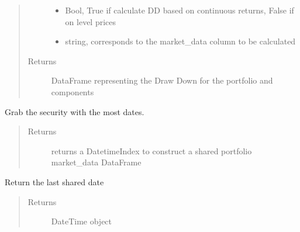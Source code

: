 \documentclass[letterpaper,10pt,english]{sphinxmanual}
\begin{document}
\begin{fulllineitems}
\begin{fulllineitems}
\begin{quote}
\begin{description}
\begin{itemize}
\item {} 
 \textendash{} Bool, True if calculate DD based on continuous returns, False if on level prices

\item {} 
 \textendash{} string, corresponds to the market\_data column to be calculated

\end{itemize}

\item[{Returns}] \leavevmode
DataFrame representing the Draw Down for the portfolio and components

\end{description}\end{quote}

\end{fulllineitems}


\begin{fulllineitems}
\label{\detokenize{securities:risk_dash.securities.Portfolio.get_date}}
Grab the security with the most dates.
\begin{quote}\begin{description}
\item[{Returns}] \leavevmode
returns a DatetimeIndex to construct a shared portfolio market\_data DataFrame

\end{description}\end{quote}

\end{fulllineitems}


\begin{fulllineitems}
\label{\detokenize{securities:risk_dash.securities.Portfolio.get_last_shared_date}}
Return the last shared date
\begin{quote}\begin{description}
\item[{Returns}] \leavevmode
DateTime object

\end{description}\end{quote}


\end{fulllineitems}
\end{fulllineitems}
\end{document}

